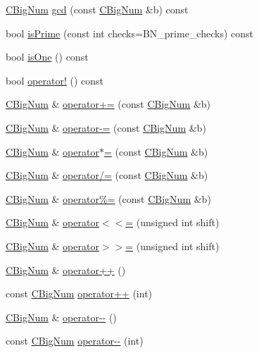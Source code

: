 \begin{DoxyCompactItemize}
\item 
\hyperlink{class_c_big_num}{C\+Big\+Num} \hyperlink{class_c_big_num_a4058ecf3603cd65c8f3effd7cef67dff}{gcd} (const \hyperlink{class_c_big_num}{C\+Big\+Num} \&b) const 
\item 
bool \hyperlink{class_c_big_num_a48650eae8b50c6a1421bd5a5ee0c38c5}{is\+Prime} (const int checks=B\+N\+\_\+prime\+\_\+checks) const 
\item 
bool \hyperlink{class_c_big_num_a74d629a04c32c7bbb1419a0cef785431}{is\+One} () const 
\item 
bool \hyperlink{class_c_big_num_af7e5e3a2debd15e28edc59208eaf34ec}{operator!} () const 
\item 
\hyperlink{class_c_big_num}{C\+Big\+Num} \& \hyperlink{class_c_big_num_ac3da33626c8ab06d6a049b310c086dd5}{operator+=} (const \hyperlink{class_c_big_num}{C\+Big\+Num} \&b)
\item 
\hyperlink{class_c_big_num}{C\+Big\+Num} \& \hyperlink{class_c_big_num_a4fe724fd22129eefc4e1f34d95505381}{operator-\/=} (const \hyperlink{class_c_big_num}{C\+Big\+Num} \&b)
\item 
\hyperlink{class_c_big_num}{C\+Big\+Num} \& \hyperlink{class_c_big_num_aedd26ffda5c04c4765ba8e18d25d9ff0}{operator$\ast$=} (const \hyperlink{class_c_big_num}{C\+Big\+Num} \&b)
\item 
\hyperlink{class_c_big_num}{C\+Big\+Num} \& \hyperlink{class_c_big_num_a213f7dc5a2d8212d3e7402a06ee5d5b9}{operator/=} (const \hyperlink{class_c_big_num}{C\+Big\+Num} \&b)
\item 
\hyperlink{class_c_big_num}{C\+Big\+Num} \& \hyperlink{class_c_big_num_ac5bec8d967502c15e2dffc8600c933e6}{operator\%=} (const \hyperlink{class_c_big_num}{C\+Big\+Num} \&b)
\item 
\hyperlink{class_c_big_num}{C\+Big\+Num} \& \hyperlink{class_c_big_num_a784951e3a24199fa6b994a951453d156}{operator$<$$<$=} (unsigned int shift)
\item 
\hyperlink{class_c_big_num}{C\+Big\+Num} \& \hyperlink{class_c_big_num_a7d2759e104a02502891b185dfb704ad1}{operator$>$$>$=} (unsigned int shift)
\item 
\hyperlink{class_c_big_num}{C\+Big\+Num} \& \hyperlink{class_c_big_num_ac9421f22614796d8520be7e6ade71ee8}{operator++} ()
\item 
const \hyperlink{class_c_big_num}{C\+Big\+Num} \hyperlink{class_c_big_num_aa69e12c7f330374b2d86df0da0627e58}{operator++} (int)
\item 
\hyperlink{class_c_big_num}{C\+Big\+Num} \& \hyperlink{class_c_big_num_a47920287946fb3a55e84af70e953e78f}{operator-\/-\/} ()
\item 
const \hyperlink{class_c_big_num}{C\+Big\+Num} \hyperlink{class_c_big_num_a13d365561d5407fc624eacb6378db4d3}{operator-\/-\/} (int)
\end{DoxyCompactItemize}
